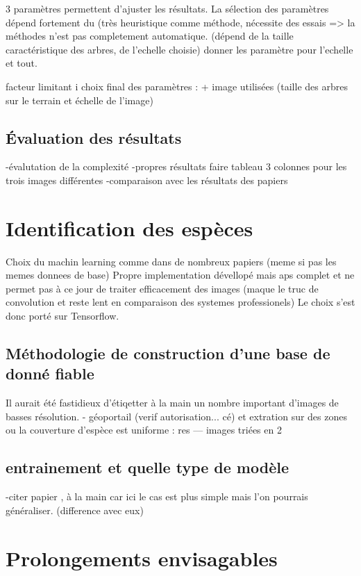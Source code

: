 \documentclass{article}
\begin{document}
	3 paramètres permettent d'ajuster les résultats. La sélection des paramètres dépend fortement du (très heuristique comme méthode, nécessite des essais => la méthodes n'est pas completement automatique. (dépend de la taille caractéristique des arbres, de l'echelle choisie) donner les paramètre pour l'echelle et tout.

		facteur limitant i
		choix final des paramètres : + image utilisées (taille des arbres sur le terrain et échelle de l'image) 

	\subsection{\'{E}valuation des résultats}
		-évalutation de la complexité 
		-propres résultats
		faire tableau 3 colonnes pour les trois images différentes
		-comparaison avec les résultats des papiers 

\section{Identification des espèces}

	Choix du machin learning comme dans de nombreux papiers (meme si pas les memes donnees de base) Propre implementation dévellopé mais aps complet et ne permet pas à ce jour de traiter efficacement des images (maque le truc de convolution et reste lent en comparaison des systemes professionels) Le choix s'est donc porté sur Tensorflow.  

	\subsection{Méthodologie de construction d'une base de donné fiable}
		Il aurait été fastidieux d'étiqetter à la main un nombre important d'images de basses résolution.   
		- géoportail (verif autorisation... cé) et extration sur des zones ou la couverture d'espèce est uniforme : res --- images triées en 2
	
	\subsection{entrainement et quelle type de modèle }
		-citer papier , à la main car ici le cas est plus simple mais l'on pourrais généraliser. (difference avec eux)

\section{Prolongements envisagables}
\end{document}
